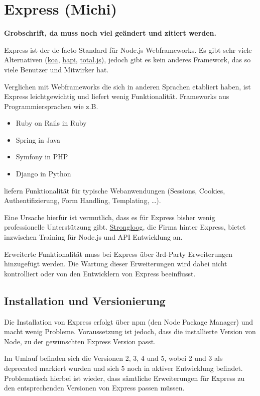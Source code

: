 \chapter{Express (Michi)}\label{express-michi}

\textbf{Grobschrift, da muss noch viel geändert und zitiert werden.}

Express ist der de-facto Standard für Node.js Webframeworks. Es gibt
sehr viele Alternativen (\href{http://koajs.com/}{koa},
\href{http://hapijs.com/}{hapi},
\href{https://github.com/totaljs/framework}{total.js}), jedoch gibt es
kein anderes Framework, das so viele Benutzer und Mitwirker hat.

Verglichen mit Webframeworks die sich in anderen Sprachen etabliert
haben, ist Express leichtgewichtig und liefert wenig Funktionalität.
Frameworks aus Programmiersprachen wie z.B.

\begin{itemize}
\item
  Ruby on Rails in Ruby
\item
  Spring in Java
\item
  Symfony in PHP
\item
  Django in Python
\end{itemize}

liefern Funktionalität für typische Webanwendungen (Sessions, Cookies,
Authentifizierung, Form Handling, Templating, \ldots{}).

Eine Ursache hierfür ist vermutlich, dass es für Express bisher wenig
professionelle Unterstützung gibt.
\href{https://strongloop.com/node-js/training/}{Strongloog}, die Firma
hinter Express, bietet inzwischen Training für Node.js und API
Entwicklung an.

Erweiterte Funktionalität muss bei Express über 3rd-Party Erweiterungen
hinzugefügt werden. Die Wartung dieser Erweiterungen wird dabei nicht
kontrolliert oder von den Entwicklern von Express beeinflusst.

\section{Installation und
Versionierung}\label{installation-und-versionierung}

Die Installation von Express erfolgt über npm (den Node Package Manager)
und macht wenig Probleme. Voraussetzung ist jedoch, dass die
installierte Version von Node, zu der gewünschten Express Version passt.

Im Umlauf befinden sich die Versionen 2, 3, 4 und 5, wobei 2 und 3 als
deprecated markiert wurden und sich 5 noch in aktiver Entwicklung
befindet. Problematisch hierbei ist wieder, dass sämtliche Erweiterungen
für Express zu den entsprechenden Versionen von Express passen müssen.

